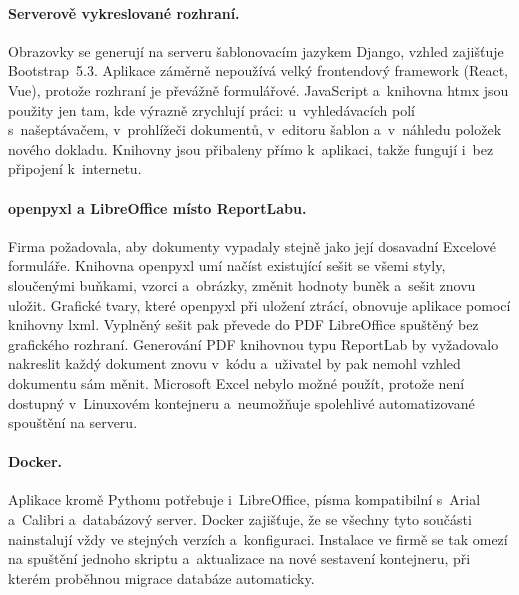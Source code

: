 \paragraph{Serverově vykreslované rozhraní.} Obrazovky se generují na serveru šablonovacím jazykem Django, vzhled zajišťuje Bootstrap~5.3. Aplikace záměrně nepoužívá velký frontendový framework (React, Vue), protože rozhraní je převážně formulářové. JavaScript a~knihovna htmx jsou použity jen tam, kde výrazně zrychlují práci: u~vyhledávacích polí s~našeptávačem, v~prohlížeči dokumentů, v~editoru šablon a~v~náhledu položek nového dokladu. Knihovny jsou přibaleny přímo k~aplikaci, takže fungují i~bez připojení k~internetu.

\paragraph{openpyxl a LibreOffice místo ReportLabu.} Firma požadovala, aby dokumenty vypadaly stejně jako její dosavadní Excelové formuláře. Knihovna openpyxl umí načíst existující sešit se všemi styly, sloučenými buňkami, vzorci a~obrázky, změnit hodnoty buněk a~sešit znovu uložit. Grafické tvary, které openpyxl při uložení ztrácí, obnovuje aplikace pomocí knihovny lxml. Vyplněný sešit pak převede do PDF LibreOffice spuštěný bez grafického rozhraní. Generování PDF knihovnou typu ReportLab by vyžadovalo nakreslit každý dokument znovu v~kódu a~uživatel by pak nemohl vzhled dokumentu sám měnit. Microsoft Excel nebylo možné použít, protože není dostupný v~Linuxovém kontejneru a~neumožňuje spolehlivé automatizované spouštění na serveru.

\paragraph{Docker.} Aplikace kromě Pythonu potřebuje i~LibreOffice, písma kompatibilní s~Arial a~Calibri a~databázový server. Docker zajišťuje, že se všechny tyto součásti nainstalují vždy ve stejných verzích a~konfiguraci. Instalace ve firmě se tak omezí na spuštění jednoho skriptu a~aktualizace na nové sestavení kontejneru, při kterém proběhnou migrace databáze automaticky.

